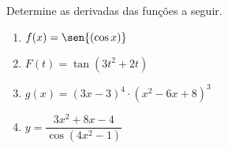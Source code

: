 \begin{frame}
  \begin{columns}[onlytextwidth]
    \begin{column}{0.48\textwidth}\vspace{-0.5cm}
      \begin{example}
        Determine as derivadas das funções a seguir.
      \end{example}
      \begin{enumerate}
        \item $f(x) = \sen{(\cos{x})}$
        \item $F(t)=\tan{(3t^{2} + 2t)}$
        \item $g(x)=(3x-3)^4 \cdot (x^2-6x+8)^3$
        \item $y=\dfrac{3x^2+8x-4}{\cos{(4x^{2}-1)}}$
      \end{enumerate}
    \end{column}
    \begin{column}{0.5\textwidth}\vspace{-0.3cm}
    \end{column}
  \end{columns}
\end{frame}
